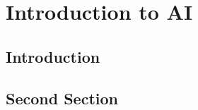 \chapter{Introduction to AI}
\label{chap:intro:ai}

\lipsum[1-2]
\section{Introduction}\label{sec:intro:ai:intro}
\lipsum[2-4]

\section{Second Section}
\lipsum[2-4]

